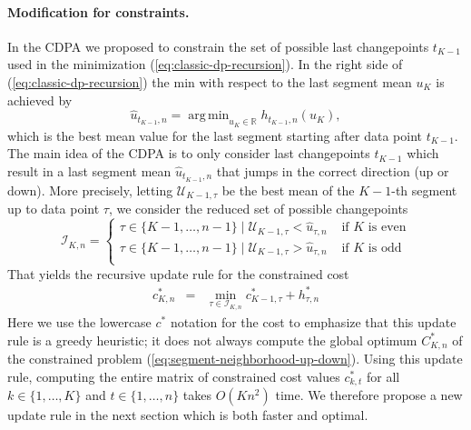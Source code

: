 \documentclass[twoside,11pt]{article}
\DeclareMathOperator*{\argmin}{arg\,min}
\newcommand{\RR}{\mathbb R}
\begin{document}
\paragraph{Modification for constraints.} In the CDPA we proposed to
constrain the set of possible last changepoints $t_{K-1}$ used in the
minimization (\ref{eq:classic-dp-recursion}). In the right side of
(\ref{eq:classic-dp-recursion}) the min with respect to the last
segment mean $u_K$ is achieved by
\begin{equation}
  \hat u_{t_{K-1},n}=\argmin_{u_K\in\RR} h_{t_{K-1},n}(u_K),
\end{equation}
which is the best mean value for the last segment starting after data
point $t_{K-1}$. The main idea of the CDPA is to only consider last
changepoints $t_{K-1}$ which result in a last segment mean
$\hat u_{t_{K-1},n}$ that jumps in the correct direction (up or
down). More precisely, letting $\mathcal U_{K-1,\tau}$ be the best
mean of the $K-1$-th segment up to data point $\tau$, we consider the
reduced set of possible changepoints
\begin{equation}
\mathcal I_{K,n} = \begin{cases}
\tau\in\{K-1, \dots, n-1\}\mid \mathcal U_{K-1,\tau}< \hat u_{\tau,n} &\text{ if $K$ is even}\\
\tau\in\{K-1, \dots, n-1\}\mid \mathcal U_{K-1,\tau}> \hat u_{\tau,n} &\text{ if $K$ is odd}\\
\end{cases}
\end{equation}
That yields the recursive update rule for the constrained  cost 
\begin{eqnarray}
\label{eq:cdpa-recursion}
c^*_{K,n} &=& \min_{\tau\in\mathcal I_{K,n}} 
c^*_{K-1,\tau} + h^*_{\tau, n}
\end{eqnarray}
Here we use the lowercase $c^*$ notation for the cost to emphasize that this update
rule is a greedy heuristic; it does not always compute the global optimum  $C^*_{K,n}$ of the constrained problem
(\ref{eq:segment-neighborhood-up-down}). Using this update rule, computing the entire matrix of constrained
cost values $c^*_{k,t}$ for all $k\in\{1,\dots, K\}$
and $t\in\{1,\dots,n\}$ takes $O(Kn^2)$ time. We therefore propose a new
update rule in the next section which is both faster and optimal.
\end{document}
